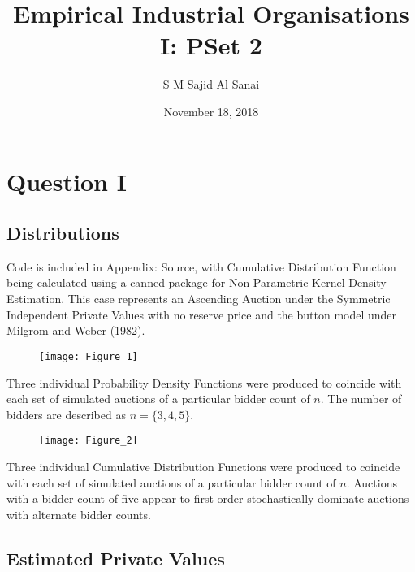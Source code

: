 \documentclass{article}
\title{Empirical Industrial Organisations I: PSet 2}
\author{S M Sajid Al Sanai}
\date{November 18, 2018}
\begin{document}
\maketitle
{}
\tableofcontents


\newpage

\section{Question I}

\subsection{Distributions}

Code is included in Appendix: Source, with Cumulative Distribution Function being calculated using a canned package for Non-Parametric Kernel Density Estimation. This case represents an Ascending Auction under the Symmetric Independent Private Values with no reserve price and the button model under Milgrom and Weber (1982).

\begin{figure}[h]
  \centering
    \texttt{[image: Figure\_1]}
\end{figure}
\FloatBarrier

Three individual Probability Density Functions were produced to coincide with each set of simulated auctions of a particular bidder count of $n$. The number of bidders are described as $n=\{3,4,5\}$.

\begin{figure}[h]
  \centering
    \texttt{[image: Figure\_2]}
\end{figure}
\FloatBarrier

Three individual Cumulative Distribution Functions were produced to coincide with each set of simulated auctions of a particular bidder count of $n$. Auctions with a bidder count of five appear to first order stochastically dominate auctions with alternate bidder counts.

\subsection{Estimated Private Values}
\end{document}

